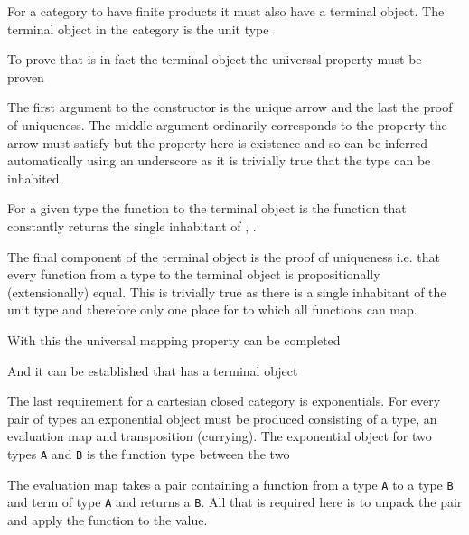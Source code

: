 For a category to have finite products it must also have a terminal object. The
terminal object in the category  is the unit type


To prove that  is in fact the terminal object the universal property
must be proven


 The first argument to the constructor is
the unique arrow and the last the proof of uniqueness. The middle argument
ordinarily corresponds to the property the arrow must satisfy but the property
here is existence and so can be inferred automatically using an underscore as it
is trivially true that the type can be inhabited.

For a given type the function to the terminal object is the function that
constantly returns the single inhabitant of , .


The final component of the terminal object is the proof of uniqueness i.e. that
every function from a type to the terminal object is propositionally
(extensionally) equal. This
is trivially true as there is a single inhabitant of the unit type and therefore
only one place for to which all functions can map.


With this the universal mapping property can be completed


And it can be established that  has a terminal object



The last requirement for a cartesian closed category is exponentials. For every
pair of types an exponential object must be produced consisting of a type, an
evaluation map and transposition (currying). The exponential object for two
types \verb|A| and \verb|B| is the function type between the two


The evaluation map takes a pair containing a function from a type \verb|A| to a
type \verb|B| and term of type \verb|A| and returns a \verb|B|. All that is
required here is to unpack the pair and apply the function to the value.

